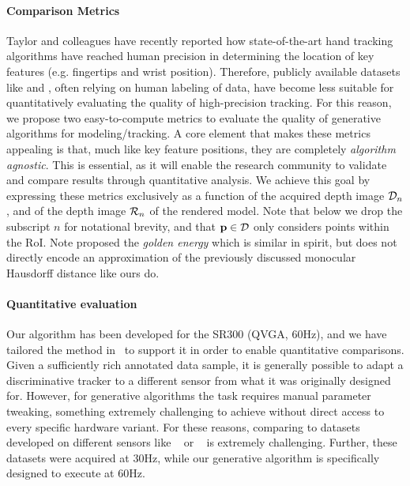 \paragraph{Comparison Metrics}
Taylor and colleagues  have recently reported how state-of-the-art hand tracking algorithms have reached human precision in determining the location of key features (e.g. fingertips and wrist position). Therefore, publicly available datasets like \cite{tompson2014real} and \cite{sridhar2013multicam}, often relying on human labeling of data, have become less suitable for quantitatively evaluating the quality of high-precision tracking. 
% 
For this reason, we propose two easy-to-compute metrics to evaluate the quality of generative algorithms for modeling/tracking. A core element that makes these metrics appealing is that, much like key feature positions, they are completely \emph{algorithm agnostic}. This is essential, as it will enable the research community to validate and compare results through quantitative analysis. 
% 
We achieve this goal by expressing these metrics exclusively as a function of the acquired depth image $\mathcal{D}_n$, and of the depth image $\mathcal{R}_{n}$ of the rendered model. Note that below we drop the subscript $n$ for notational brevity, and that $\mathbf{p} \in \mathcal{D}$ only considers points within the RoI. Note \cite{sharp2015accurate} proposed the \emph{golden energy} which is similar in spirit, but does not directly encode an approximation of the previously discussed monocular Hausdorff distance like ours do.

\paragraph{Quantitative evaluation}
Our algorithm has been developed for the \realsense{} SR300 (QVGA, 60Hz), and we have tailored the method in~\cite{tagliasacchi2015robust} to support it in order to enable quantitative comparisons.
% 
Given a sufficiently rich annotated data sample, it is generally possible to adapt a discriminative tracker to a different sensor from what it was originally designed for. However, for generative algorithms the task requires manual parameter tweaking, something extremely challenging to achieve without direct access to every specific hardware variant.
% 
For these reasons, comparing to datasets developed on different sensors like \dexter{}~\cite{sridhar2013multicam} or \fingerpaint{}~\cite{sharp2015accurate} is extremely challenging. 
Further, these datasets were acquired at 30Hz, while our generative algorithm is specifically designed to execute at 60Hz.

